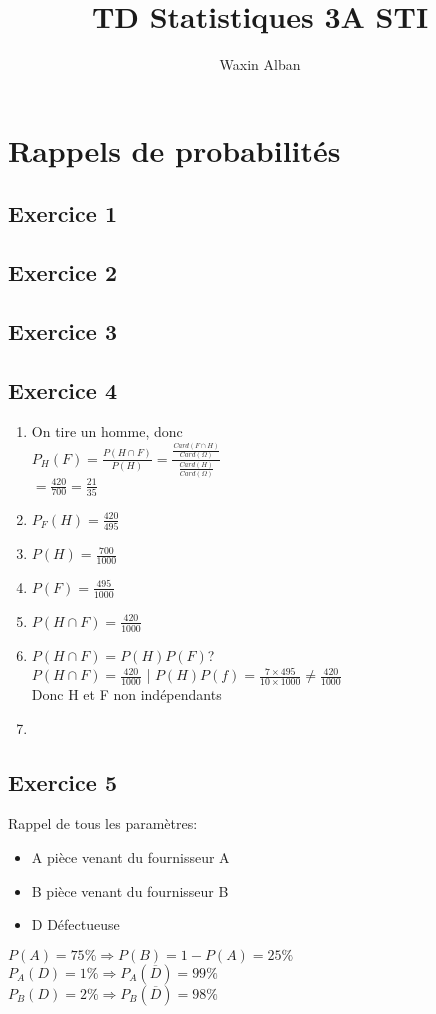 \documentclass[12pt]{report}
\title{TD Statistiques 3A STI}
\author{Waxin Alban}
\begin{document}
\chapter{Rappels de probabilités}
\section{Exercice 1}
\section{Exercice 2}
\section{Exercice 3}
\section{Exercice 4}
\normalsize
\begin{enumerate}
    \item On tire un homme, donc \\
        $P_H(F) = \frac{P(H \cap F)}{P(H)} = \frac{\frac{Card(F\cap H)}{Card(\Omega)}}{\frac{Card(H)}{Card(\Omega)}}$ \\
        $= \frac{420}{700} = \frac{21}{35}$
    \item $P_F(H) = \frac{420}{495}$
    \item $P(H) = \frac{700}{1000}$
    \item $P(F) = \frac{495}{1000}$
    \item $P(H \cap F) = \frac{420}{1000}$
    \item $P(H \cap F) = P(H)P(F)$?\\
    $P(H\cap F) = \frac{420}{1000}$    |   $P(H)P(f)= \frac{7\times495}{10 \times 1000} \neq \frac{420}{1000}$\\
    Donc H et F non indépendants
    \item 
\end{enumerate}

\section{Exercice 5}

Rappel de tous les paramètres:\\
\begin{itemize}
    \item  A pièce venant du fournisseur A
    \item B pièce venant du fournisseur B
    \item D Défectueuse
\end{itemize}
$P(A) = 75 \% \Rightarrow P(B) = 1 - P(A) = 25\%$\\
$P_A(D) = 1 \% \Rightarrow P_A(\overline{D}) = 99 \%$\\
$P_B(D) = 2 \% \Rightarrow P_B(\overline{D}) = 98 \%$\\
\end{document}
